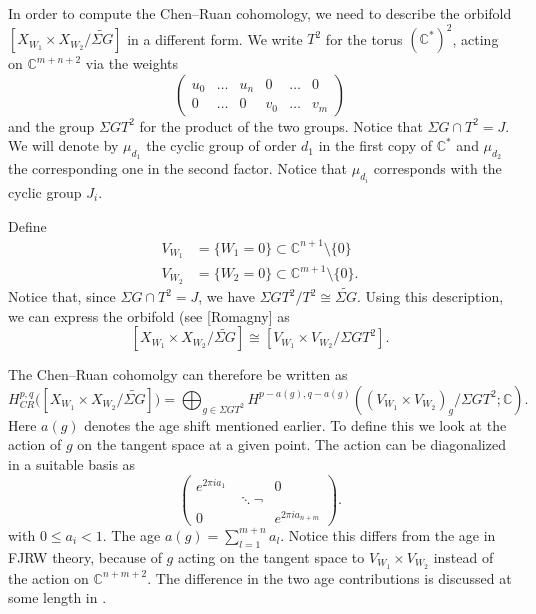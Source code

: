 \documentclass[10pt, letterpaper]{amsart}
\theoremstyle{remark}
\newcommand{\CC}{\mathbb C}
\newcommand{\set}[1]{\{#1\}}
\newcommand{\s}[1]{\Sigma #1}
\begin{document}
In order to compute the Chen--Ruan cohomology, we need to describe the orbifold $\left[X_{W_1}\times X_{W_2}/\widetilde{\s{G}}\right]$ in a different form.
We write $T^2$ for the torus $(\CC^*)^2$, acting on $\CC^{m+n+2}$ via the weights 
\[
\left(\begin{matrix}
u_0 & \dots & u_n & 0 & \dots & 0 \\
0 & \dots & 0 & v_0 & \dots & v_m   
\end{matrix}
\right)
\]
and the group $\s{G}T^2$ for the product of the two groups. Notice that $\s{G}\cap T^2=J$. We will denote by $\mu_{d_1}$ the cyclic group of order $d_1$ in the first copy of $\CC^*$ and $\mu_{d_2}$ the corresponding one in the second factor. Notice that $\mu_{d_i}$ corresponds with the cyclic group $J_i$. 

Define 
\begin{align*}
V_{W_1}&=\set{W_1=0}\subset \CC^{n+1}\setminus \set{0}    \\
V_{W_2}&=\set{W_2=0}\subset \CC^{m+1}\setminus \set{0}.
\end{align*}
Notice that, since $\s{G}\cap T^2=J$, we have $\s{G}T^2/T^2\cong \widetilde{\s{G}}$. Using this description, we can express the orbifold (see \cite{}[Romagny] as 
\[
\left[X_{W_1}\times X_{W_2}/\widetilde{\s{G}}\right]\cong \left[V_{W_1}\times V_{W_2}/\s{G}T^2\right].
\]
 
The Chen--Ruan cohomolgy can therefore be written as %
\begin{equation}\label{e:CRdirectsum}
H^{p,q}_{CR}\Big(\left[X_{W_1}\times X_{W_2}/\widetilde{\s{G}}\right]\Big)=\bigoplus_{g\in\s{G}T^2}H^{p-a(g),q-a(g)}((V_{W_1}\times V_{W_2})_{g}/\s{G}T^2;\CC).
\end{equation}
Here $a(g)$ denotes the age shift mentioned earlier. To define this we look at the action of $g$ on the tangent space at a given point. The action can be diagonalized in a suitable basis as
\[
\left(\begin{matrix}
e^{2\pi i a_1} & & 0 \\
& \ddots ¬ \\
0& & e^{2\pi i a_{n+m}}
\end{matrix}\right).
\]
with $0\leq a_i<1$. The age $a(g)=\sum_{l=1}^{m+n}a_l$. Notice this differs from the age in FJRW theory, because of $g$ acting on the tangent space to $V_{W_1}\times V_{W_2}$ instead of the action on $\CC^{n+m+2}$. The difference in the two age contributions is discussed at some length in \cite{ChR}. 
\end{document}

